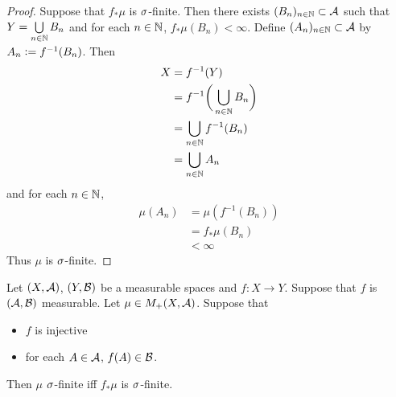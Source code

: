 \documentclass{book}
\begin{document}
\begin{proof}
	Suppose that $f_*\mu$ is $\sigma$-finite. Then there exists $(B_n)_{n \in \mathbb{N}} \subset \mathcal{A}$ such that $Y = \bigcup\limits_{n \in \mathbb{N}} B_n$ and for each $n \in \mathbb{N}$, $f_*\mu(B_n) < \infty$. Define $(A_n)_{n \in \mathbb{N}} \subset \mathcal{A}$ by $A_n \vcentcolon= f^{-1}(B_n)$. Then 
	\begin{align*}
		X
		& = f^{-1}(Y) \\
		& =  f^{-1} \bigg( \bigcup\limits_{n \in \mathbb{N}} B_n \bigg) \\
		& =  \bigcup\limits_{n \in \mathbb{N}} f^{-1}(B_n) \\
		& =  \bigcup_{n \in \mathbb{N}} A_n \\
	\end{align*}
	and for each $n \in \mathbb{N}$,
	\begin{align*}
		\mu(A_n)
		& = \mu(f^{-1}(B_n)) \\
		& = f_*\mu(B_n) \\
		& < \infty 
	\end{align*}
	Thus $\mu$ is $\sigma$-finite.
\end{proof}

\begin{ex} 
	Let $(X, \mathcal{A})$, $(Y, \mathcal{B})$ be a measurable spaces and $f: X \rightarrow Y$. Suppose that $f$ is $(\mathcal{A}, \mathcal{B})$ measurable. Let $\mu \in M_+(X, \mathcal{A})$. Suppose that 
	\begin{itemize}
		\item $f$ is injective
		\item for each $A \in \mathcal{A}$, $f(A) \in \mathcal{B}$.
	\end{itemize} 
	Then $\mu$ $\sigma$-finite iff $f_*\mu$ is $\sigma$-finite.
\end{ex}
\end{document}
